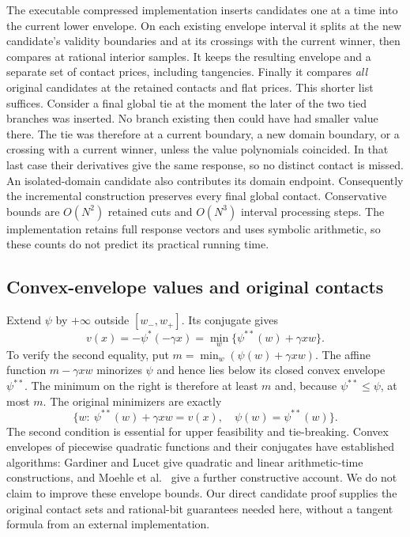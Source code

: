The executable compressed implementation inserts candidates one at a time into
the current lower envelope. On each existing envelope interval it splits at the
new candidate's validity boundaries and at its crossings with the current
winner, then compares at rational interior samples. It keeps the resulting
envelope and a separate set of contact prices, including tangencies. Finally it
compares \emph{all} original candidates at the retained contacts and flat
prices. This shorter list suffices. Consider a final global tie at the moment
the later of the two tied branches was inserted. No branch existing then could
have had smaller value there. The tie was therefore at a current boundary, a
new domain boundary, or a crossing with a current winner, unless the value
polynomials coincided. In that last case their derivatives give the same
response, so no distinct contact is missed. An isolated-domain candidate also
contributes its domain endpoint. Consequently the incremental construction
preserves every final global contact. Conservative bounds are $O(N^2)$ retained
cuts and $O(N^3)$ interval processing steps. The implementation retains full
response vectors and uses symbolic arithmetic, so these counts do not predict
its practical running time.

\subsection{Convex-envelope values and original contacts}
\label{subsec:contacts}
Extend $\psi$ by $+\infty$ outside $[w_-,w_+]$. Its conjugate gives
\begin{equation}\label{eq:contact-conjugacy}
 v(x)=-\psi^*(-\gamma x)
     =\min_w\{\psi^{**}(w)+\gamma xw\}.
\end{equation}
To verify the second equality, put $m=\min_w(\psi(w)+\gamma xw)$. The affine
function $m-\gamma xw$ minorizes $\psi$ and hence lies below its closed convex
envelope $\psi^{**}$. The minimum on the right is therefore at least $m$ and,
because $\psi^{**}\le\psi$, at most $m$. The original minimizers are exactly
\begin{equation}\label{eq:actual-contact}
 \{w:\ \psi^{**}(w)+\gamma xw=v(x),\quad \psi(w)=\psi^{**}(w)\}.
\end{equation}
The second condition is essential for upper feasibility and tie-breaking.
Convex envelopes of piecewise quadratic functions and their conjugates have
established algorithms: Gardiner and Lucet
\citep[Propositions 3.1 and 4.3]{GardinerLucet2010} give quadratic and linear
arithmetic-time constructions, and Moehle et al.~\citep[Section 6.3 and
Appendix B]{MoehleEtAl2023} give a further constructive account. We do not
claim to improve these envelope bounds. Our direct candidate proof supplies
the original contact sets and rational-bit guarantees needed here, without a
tangent formula from an external implementation.

